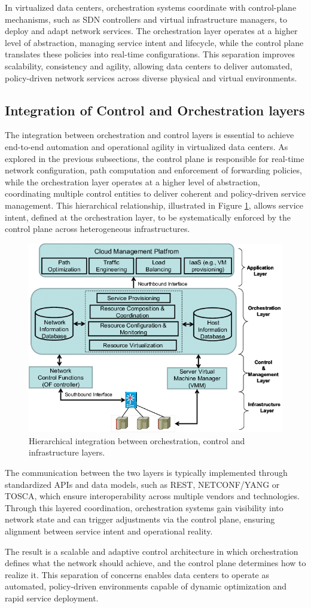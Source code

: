 In virtualized data centers, orchestration systems coordinate with control-plane mechanisms, such as SDN controllers and virtual infrastructure managers, to deploy and adapt network services. The orchestration layer operates at a higher level of abstraction, managing service intent and lifecycle, while the control plane translates these policies into real-time configurations. This separation improves scalability, consistency and agility, allowing data centers to deliver automated, policy-driven network services across diverse physical and virtual environments.

\subsection{Integration of Control and Orchestration layers}

The integration between orchestration and control layers is essential to achieve end-to-end automation and operational agility in virtualized data centers. As explored in the previous subsections, the control plane is responsible for real-time network configuration, path computation and enforcement of forwarding policies, while the orchestration layer operates at a higher level of abstraction, coordinating multiple control entities to deliver coherent and policy-driven service management. This hierarchical relationship, illustrated in Figure \ref{layerIntegration}, allows service intent, defined at the orchestration layer, to be systematically enforced by the control plane across heterogeneous infrastructures.

\begin{figure}[H]
    \centering
    \vspace{-5pt}
    \includegraphics[width=0.5\linewidth]{Figures/layerIntegration.png}
    \caption{Hierarchical integration between orchestration, control and infrastructure layers. \cite{adami2015orchestrator}}
    \label{layerIntegration}
\end{figure}

The communication between the two layers is typically implemented through standardized APIs and data models, such as REST, NETCONF/YANG or TOSCA, which ensure interoperability across multiple vendors and technologies. Through this layered coordination, orchestration systems gain visibility into network state and can trigger adjustments via the control plane, ensuring alignment between service intent and operational reality.

The result is a scalable and adaptive control architecture in which orchestration defines what the network should achieve, and the control plane determines how to realize it. This separation of concerns enables data centers to operate as automated, policy-driven environments capable of dynamic optimization and rapid service deployment.